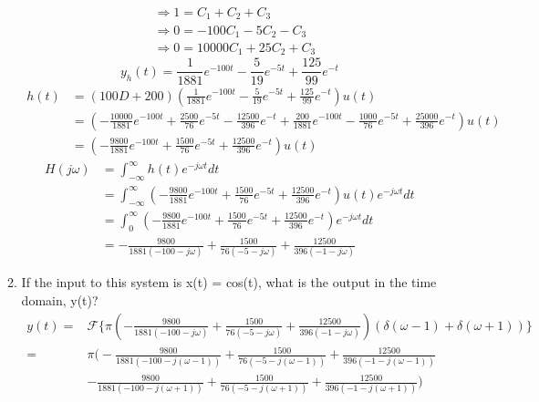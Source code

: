 \documentclass{article}
\begin{document}
\begin{enumerate}
\begin{enumerate}
\begin{align}
            &\Rightarrow 1 = C_1+C_2+C_3\\
            &\Rightarrow 0 = -100C_1-5C_2-C_3\\
            &\Rightarrow 0 = 10000C_1+25C_2+C_3
        \end{align}
        \begin{equation}
            y_h(t) = \frac{1}{1881}e^{-100t}-\frac{5}{19}e^{-5t}+\frac{125}{99}e^{-t}
        \end{equation}
        \begin{align}
            h(t) &= (100D+200)(\frac{1}{1881}e^{-100t}-\frac{5}{19}e^{-5t}+\frac{125}{99}e^{-t})u(t)\\
            &= (-\frac{10000}{1881}e^{-100t}+\frac{2500}{76}e^{-5t}-\frac{12500}{396}e^{-t}+\frac{200}{1881}e^{-100t}-\frac{1000}{76}e^{-5t}+\frac{25000}{396}e^{-t})u(t)\\
            &= (-\frac{9800}{1881}e^{-100t}+\frac{1500}{76}e^{-5t}+\frac{12500}{396}e^{-t})u(t)
        \end{align}
        \begin{align}
            H(j\omega) &= \int_{-\infty}^\infty h(t)e^{-j\omega t}dt\\
            &= \int_{-\infty}^\infty (-\frac{9800}{1881}e^{-100t}+\frac{1500}{76}e^{-5t}+\frac{12500}{396}e^{-t})u(t)e^{-j\omega t}dt\\
            &= \int_{0}^\infty (-\frac{9800}{1881}e^{-100t}+\frac{1500}{76}e^{-5t}+\frac{12500}{396}e^{-t})e^{-j\omega t}dt\\
            &= \boxed{-\frac{9800}{1881(-100-j\omega)}+\frac{1500}{76(-5-j\omega)}+\frac{12500}{396(-1-j\omega)}}
            \end{align}
        \item If the input to this system is x(t) = cos(t), what is the output in the time domain, y(t)?
        \begin{align}
            y(t) = &\mathcal{F}\bigg\{\pi(-\frac{9800}{1881(-100-j\omega)}+\frac{1500}{76(-5-j\omega)}+\frac{12500}{396(-1-j\omega)})(\delta(\omega-1)+\delta(\omega+1))\bigg\}\\
            = &\pi\bigg(-\frac{9800}{1881(-100-j(\omega-1))}+\frac{1500}{76(-5-j(\omega-1))}+\frac{12500}{396(-1-j(\omega-1))}\\
            &-\frac{9800}{1881(-100-j(\omega+1))}+\frac{1500}{76(-5-j(\omega+1))}+\frac{12500}{396(-1-j(\omega+1))}\bigg)
        \end{align}
    \end{enumerate}
    \newpage

\end{enumerate}
\end{document}
